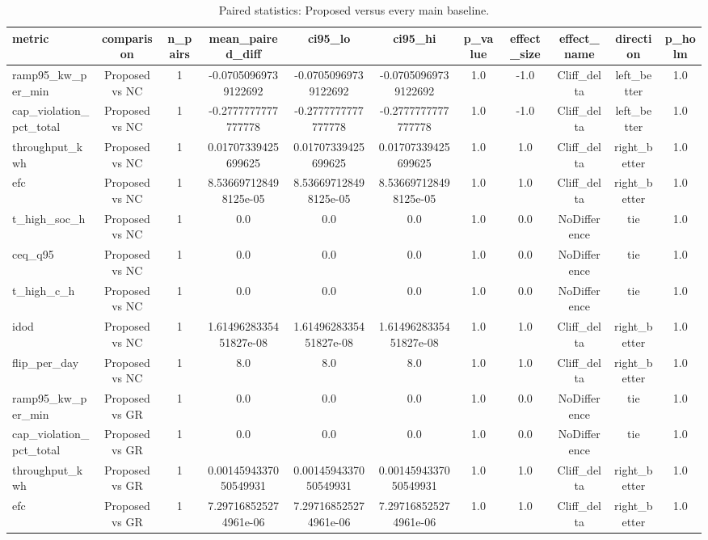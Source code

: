 \begin{table}[t]
\centering
\caption{Paired statistics: Proposed versus every main baseline.}
\label{tab:stats_all_auto}
\begin{tabular}{lcccccccccc}
\toprule
metric & comparison & n\_pairs & mean\_paired\_diff & ci95\_lo & ci95\_hi & p\_value & effect\_size & effect\_name & direction & p\_holm \\
\midrule
ramp95\_kw\_per\_min & Proposed vs NC & 1 & -0.07050969739122692 & -0.07050969739122692 & -0.07050969739122692 & 1.0 & -1.0 & Cliff\_delta & left\_better & 1.0 \\
cap\_violation\_pct\_total & Proposed vs NC & 1 & -0.2777777777777778 & -0.2777777777777778 & -0.2777777777777778 & 1.0 & -1.0 & Cliff\_delta & left\_better & 1.0 \\
throughput\_kwh & Proposed vs NC & 1 & 0.01707339425699625 & 0.01707339425699625 & 0.01707339425699625 & 1.0 & 1.0 & Cliff\_delta & right\_better & 1.0 \\
efc & Proposed vs NC & 1 & 8.536697128498125e-05 & 8.536697128498125e-05 & 8.536697128498125e-05 & 1.0 & 1.0 & Cliff\_delta & right\_better & 1.0 \\
t\_high\_soc\_h & Proposed vs NC & 1 & 0.0 & 0.0 & 0.0 & 1.0 & 0.0 & NoDifference & tie & 1.0 \\
ceq\_q95 & Proposed vs NC & 1 & 0.0 & 0.0 & 0.0 & 1.0 & 0.0 & NoDifference & tie & 1.0 \\
t\_high\_c\_h & Proposed vs NC & 1 & 0.0 & 0.0 & 0.0 & 1.0 & 0.0 & NoDifference & tie & 1.0 \\
idod & Proposed vs NC & 1 & 1.6149628335451827e-08 & 1.6149628335451827e-08 & 1.6149628335451827e-08 & 1.0 & 1.0 & Cliff\_delta & right\_better & 1.0 \\
flip\_per\_day & Proposed vs NC & 1 & 8.0 & 8.0 & 8.0 & 1.0 & 1.0 & Cliff\_delta & right\_better & 1.0 \\
ramp95\_kw\_per\_min & Proposed vs GR & 1 & 0.0 & 0.0 & 0.0 & 1.0 & 0.0 & NoDifference & tie & 1.0 \\
cap\_violation\_pct\_total & Proposed vs GR & 1 & 0.0 & 0.0 & 0.0 & 1.0 & 0.0 & NoDifference & tie & 1.0 \\
throughput\_kwh & Proposed vs GR & 1 & 0.0014594337050549931 & 0.0014594337050549931 & 0.0014594337050549931 & 1.0 & 1.0 & Cliff\_delta & right\_better & 1.0 \\
efc & Proposed vs GR & 1 & 7.297168525274961e-06 & 7.297168525274961e-06 & 7.297168525274961e-06 & 1.0 & 1.0 & Cliff\_delta & right\_better & 1.0 \\

\end{tabular}
\end{table}
